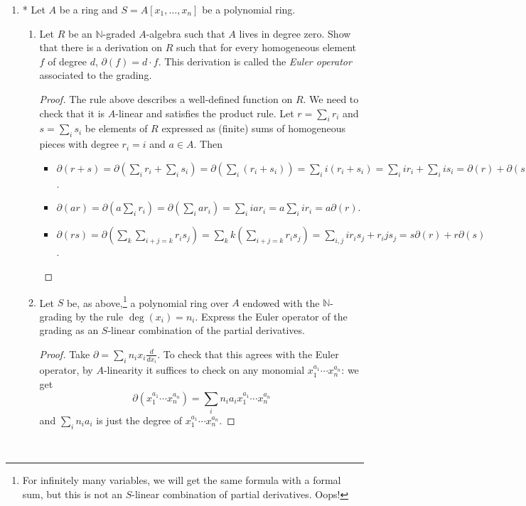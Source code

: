 \documentclass{amsart}[12pt]
\newcommand{\N}{\mathbb{N}}
\numberwithin{equation}{section}
\theoremstyle{plain} %
\theoremstyle{definition}
\theoremstyle{remark}
\newcommand{\red}[1]{{\color{red}#1}}
\begin{document}
\begin{enumerate}
\item* Let $A$ be a ring and $S=A[x_1,\dots,x_n]$ be a polynomial ring.
\begin{enumerate}
\item Let $R$ be an $\N$-graded $A$-algebra such that $A$ lives in degree zero. Show that there is a derivation on $R$ such that for every homogeneous element $f$ of degree $d$, $\partial(f) = d\cdot  f$. This derivation is called the \emph{Euler operator} associated to the grading. 
\begin{proof} The rule above describes a well-defined function on $R$. We need to check that it is $A$-linear and satisfies the product rule.
Let $r=\sum_i r_i$ and $s=\sum_i s_i$ be elements of $R$ expressed as (finite) sums of homogeneous pieces with degree $r_i=i$ and $a\in A$. Then\begin{itemize}
\item $\partial(r+s) = \partial(\sum_i r_i + \sum_i s_i) =  \partial(\sum_i (r_i + s_i) ) = \sum_i i(r_i + s_i) = \sum_i i r_i + \sum_i i s_i = \partial(r) + \partial(s)$.
\item $\partial(ar) = \partial( a \sum_i r_i) = \partial(\sum_i ar_i ) = \sum_i i ar_i = a \sum_i i r_i = a\partial(r)$.
\item $\partial(rs) = \partial(\sum_k \sum_{i+j=k} r_i s_j) = \sum_k k (\sum_{i+j=k} r_i s_j) = \sum_{i,j} i r_i s_j + r_i j s_j = s\partial(r) + r\partial(s)$.
\end{itemize}
\end{proof}
\item Let $S$ \red{be, as above,}\footnote{For infinitely many variables, we will get the same formula with a formal sum, but this is not an $S$-linear combination of partial derivatives. Oops!} a polynomial ring over $A$ endowed with the $\N$-grading by the rule $\deg(x_i) = n_i$. Express the Euler operator of the grading as an $S$-linear combination of the partial derivatives.
\begin{proof}
Take $\partial = \sum_i n_i x_i \frac{d}{dx_i}$. To check that this agrees with the Euler operator, by  $A$-linearity it suffices to check on any monomial $x_1^{a_1}\cdots x_n^{a_n}$: we get
\[ \partial(x_1^{a_1}\cdots x_n^{a_n}) = \sum_i n_i a_i x_1^{a_1}\cdots x_n^{a_n}\]
and $\sum_i n_i a_i$ is just the degree of $x_1^{a_1}\cdots x_n^{a_n}$.\qedhere
\end{proof}
\end{enumerate}

\


\end{enumerate}
\end{document}
